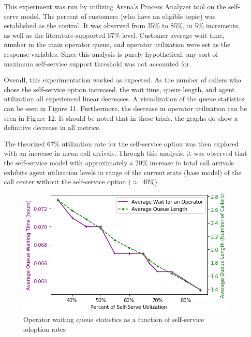 \documentclass[12pt]{article}
\begin{document}
	\par
	
	This experiment was run by utilizing Arena's Process Analyzer tool on the self-serve model.  The percent of customers (who have an eligible topic) was established as the control.  It was observed from 35\% to 85\%, in 5\% increments, as well as the literature-supported 67\% level.  Customer average wait time, number in the main operator queue, and operator utilization were set as the response variables.  Since this analysis is purely hypothetical, any sort of maximum self-service support threshold was not accounted for.
	
	\par
	
	Overall, this experimentation worked as expected.  As the number of callers who chose the self-service option increased, the wait time, queue length, and agent utilization all experienced linear decreases.  A visualization of the queue statistics can be seen in Figure 11.  Furthermore, the decrease in operator utilization can be seen in Figure 12.  It should be noted that in these trials, the graphs do show a definitive decrease in all metrics.
	
	\par
	
	The theorized 67\% utilization rate for the self-service option was then explored with an increase in mean call arrivals.  Through this analysis, it was observed that the self-service model with approximately a 20\% increase in total call arrivals exhibits agent utilization levels in range of the current state (base model) of the call center without the self-service option ($\approx$ 40\%).

\begin{figure}[h]
	\includegraphics[scale=.5]{self_serve_results.png}
	\caption{Operator waiting queue statistics as a function of self-service adoption rates}
\end{figure}
\end{document}

